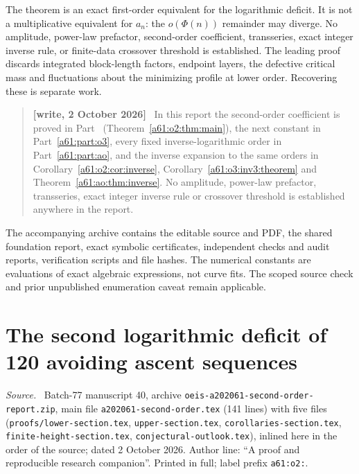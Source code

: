 \documentclass[11pt,letterpaper]{article}
\numberwithin{equation}{section}
\theoremstyle{remark}\newtheorem{remark}[theorem]{Remark}
\newenvironment{writenote}{\par\smallskip\begin{quote}\small\textbf{[write, 2 October 2026]}\ }{\end{quote}\smallskip}
\newenvironment{partsource}{\par\medskip\noindent\begin{minipage}{\linewidth}\small\raggedright\textit{Source.}\ }{\end{minipage}\par\medskip}
\begin{document}
The theorem is an exact first-order equivalent for the logarithmic deficit. It is not a multiplicative equivalent for $a_n$: the $o(\Phi(n))$ remainder may diverge. No amplitude, power-law prefactor, second-order coefficient, transseries, exact integer inverse rule, or finite-data crossover threshold is established. The leading proof discards integrated block-length factors, endpoint layers, the defective critical mass and fluctuations about the minimizing profile at lower order. Recovering these is separate work.
\begin{writenote}
In this report the second-order coefficient is proved in Part~\ref{a61:part:o2} (Theorem~\ref{a61:o2:thm:main}), the next constant in Part~\ref{a61:part:o3}, every fixed inverse-logarithmic order in Part~\ref{a61:part:ao}, and the inverse expansion to the same orders in Corollary~\ref{a61:o2:cor:inverse}, Corollary~\ref{a61:o3:inv3:theorem} and Theorem~\ref{a61:ao:thm:inverse}. No amplitude, power-law prefactor, transseries, exact integer inverse rule or crossover threshold is established anywhere in the report.
\end{writenote}


The accompanying archive contains the editable source and PDF, the shared foundation report, exact symbolic certificates, independent checks and audit reports, verification scripts and file hashes. The numerical constants are evaluations of exact algebraic expressions, not curve fits. The scoped source check and prior unpublished enumeration caveat remain applicable.


\part{The second logarithmic deficit of 120 avoiding ascent sequences}\label{a61:part:o2}

\begin{partsource}
Batch-77 manuscript 40, archive \texttt{oeis-a202061-second-order-report.zip}, main file \texttt{a202061-second-order.tex} (141 lines) with five \verb|| files (\texttt{proofs/lower-section.tex}, \texttt{upper-section.tex}, \texttt{corollaries-section.tex}, \texttt{finite-height-section.tex}, \texttt{conjectural-outlook.tex}), inlined here in the order of the source; dated 2 October 2026. Author line: ``A proof and reproducible research companion''. Printed in full; label prefix \texttt{a61:o2:}.
\end{partsource}
\end{document}
